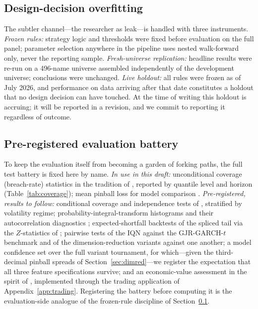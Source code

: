 \documentclass[11pt]{article}
\begin{document}
\subsection{Design-decision overfitting}\label{sec:frozen}
The subtler channel---the researcher as leak---is handled with three instruments. \emph{Frozen rules:} strategy logic and thresholds were fixed before evaluation on the full panel; parameter selection anywhere in the pipeline uses nested walk-forward only, never the reporting sample. \emph{Fresh-universe replication:} headline results were re-run on a 496-name universe assembled independently of the development universe; conclusions were unchanged. \emph{Live holdout:} all rules were frozen as of July 2026, and performance on data arriving after that date constitutes a holdout that no design decision can have touched. At the time of writing this holdout is accruing; it will be reported in a revision, and we commit to reporting it regardless of outcome.

\subsection{Pre-registered evaluation battery}\label{sec:battery}
To keep the evaluation itself from becoming a garden of forking paths, the full test battery is fixed here by name. \emph{In use in this draft:} unconditional coverage (breach-rate) statistics in the tradition of \citet{kupiec1995}, reported by quantile level and horizon (Table~\ref{tab:coverage}); mean pinball loss for model comparison \citep{gneitingraftery2007}. \emph{Pre-registered, results to follow:} conditional coverage and independence tests of \citet{christoffersen1998}, stratified by volatility regime; probability-integral-transform histograms and their autocorrelation diagnostics \citep{dieboldgunthertay1998}; expected-shortfall backtests of the spliced tail via the $Z$-statistics of \citet{acerbiszekely2014}; pairwise \citet{dieboldmariano1995} tests of the IQN against the GJR-GARCH-$t$ benchmark and of the dimension-reduction variants against one another; a model confidence set \citep{hansen2011mcs} over the full variant tournament, for which---given the third-decimal pinball spreads of Section~\ref{sec:dimred}---we register the expectation that all three feature specifications survive; and an economic-value assessment in the spirit of \citet{fleming2001}, implemented through the trading application of Appendix~\ref{app:trading}. Registering the battery before computing it is the evaluation-side analogue of the frozen-rule discipline of Section~\ref{sec:frozen}.
\end{document}
